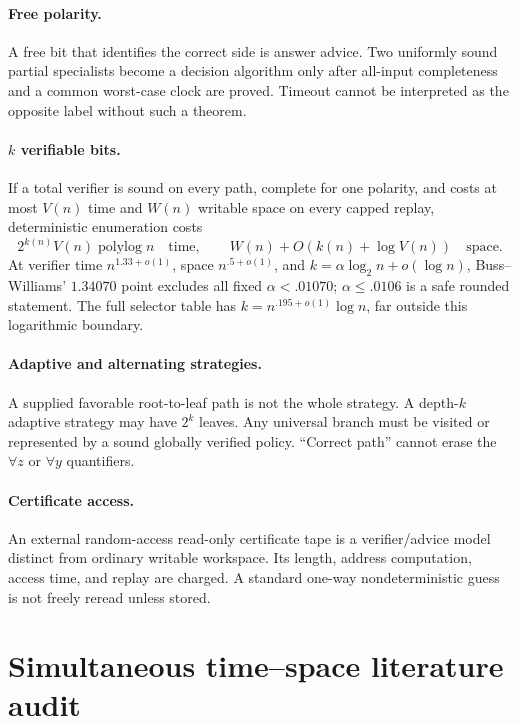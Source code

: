 \documentclass[11pt]{article}
\begin{document}
\paragraph{Free polarity.}
A free bit that identifies the correct side is answer advice.  Two uniformly sound partial specialists become a decision algorithm only after all-input completeness and a common worst-case clock are proved.  Timeout cannot be interpreted as the opposite label without such a theorem.

\paragraph{$k$ verifiable bits.}
If a total verifier is sound on every path, complete for one polarity, and costs at most $V(n)$ time and $W(n)$ writable space on every capped replay, deterministic enumeration costs
\[
 2^{k(n)}V(n)\operatorname{polylog}n
 \quad\text{time},\qquad
 W(n)+O(k(n)+\log V(n))
 \quad\text{space}.
\]
At verifier time $n^{1.33+o(1)}$, space $n^{.5+o(1)}$, and $k=\alpha\log_2 n+o(\log n)$, Buss--Williams' $1.34070$ point excludes all fixed $\alpha<.01070$; $\alpha\le.0106$ is a safe rounded statement.  The full selector table has $k=n^{.195+o(1)}\log n$, far outside this logarithmic boundary.

\paragraph{Adaptive and alternating strategies.}
A supplied favorable root-to-leaf path is not the whole strategy.  A depth-$k$ adaptive strategy may have $2^k$ leaves.  Any universal branch must be visited or represented by a sound globally verified policy.  ``Correct path'' cannot erase the $\forall z$ or $\forall y$ quantifiers.

\paragraph{Certificate access.}
An external random-access read-only certificate tape is a verifier/advice model distinct from ordinary writable workspace.  Its length, address computation, access time, and replay are charged.  A standard one-way nondeterministic guess is not freely reread unless stored.

\section{Simultaneous time--space literature audit}
\end{document}

